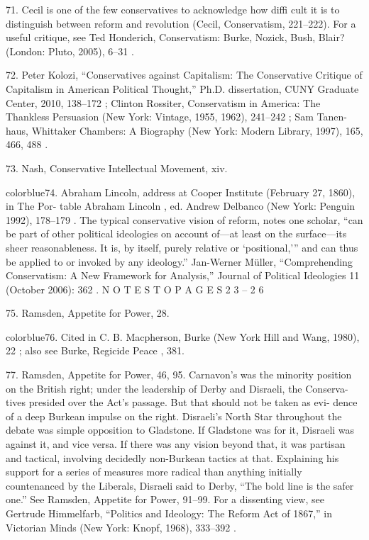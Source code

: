 	{\color{blue}71}. Cecil is one of the few conservatives to acknowledge how diffi cult it is to distinguish between reform and revolution (Cecil, Conservatism, 221–222). For a useful critique, see Ted Honderich, Conservatism: Burke, Nozick, Bush, Blair? (London: Pluto, 2005), 6–31 .


	{\color{blue}72}. Peter Kolozi, “Conservatives against Capitalism: The Conservative Critique of Capitalism in American Political Thought,” Ph.D. dissertation, CUNY Graduate Center, 2010, 138–172 ; Clinton Rossiter, Conservatism in America: The Thankless Persuasion (New York: Vintage, 1955, 1962), 241–242 ; Sam Tanen- haus, Whittaker Chambers: A Biography (New York: Modern Library, 1997), 165, 466, 488 .


	{\color{blue}73}. Nash, Conservative Intellectual Movement, xiv.


	{color{blue}74}. Abraham Lincoln, address at Cooper Institute (February 27, 1860), in The Por- table Abraham Lincoln , ed. Andrew Delbanco (New York: Penguin 1992), 178–179 . The typical conservative vision of reform, notes one scholar, “can be part of other political ideologies on account of—at least on the surface—its sheer reasonableness. It is, by itself, purely relative or ‘positional,’” and can thus be applied to or invoked by any ideology.” Jan-Werner Müller, “Comprehending Conservatism: A New Framework for Analysis,” Journal of Political Ideologies 11 (October 2006): 362 . N O T E S T O P A G E S 2 3 – 2 6


	{\color{blue}75}. Ramsden, Appetite for Power, 28.


	{color{blue}76}. Cited in C. B. Macpherson, Burke (New York Hill and Wang, 1980), 22 ; also see Burke, Regicide Peace , 381.


	{\color{blue}77}. Ramsden, Appetite for Power, 46, 95. Carnavon’s was the minority position on the British right; under the leadership of Derby and Disraeli, the Conserva- tives presided over the Act’s passage. But that should not be taken as evi- dence of a deep Burkean impulse on the right. Disraeli’s North Star throughout the debate was simple opposition to Gladstone. If Gladstone was for it, Disraeli was against it, and vice versa. If there was any vision beyond that, it was partisan and tactical, involving decidedly non-Burkean tactics at that. Explaining his support for a series of measures more radical than anything initially countenanced by the Liberals, Disraeli said to Derby, “The bold line is the safer one.” See Ramsden, Appetite for Power, 91–99. For a dissenting view, see Gertrude Himmelfarb, “Politics and Ideology: The Reform Act of 1867,” in Victorian Minds (New York: Knopf, 1968), 333–392 .


